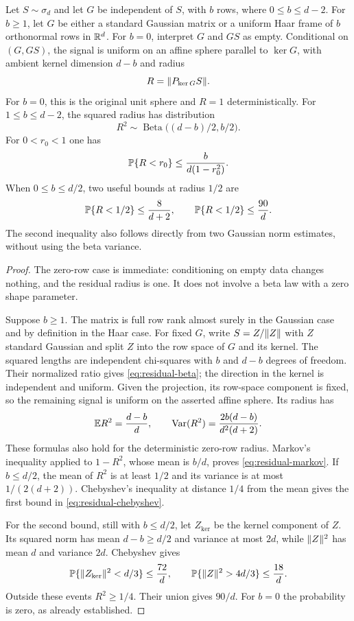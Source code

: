 \begin{lemma}\label{lem:residual-sphere}
Let $S\sim\sigma_d$ and let $G$ be independent of $S$, with $b$ rows,
where $0\le b\le d-2$. For $b\ge1$, let $G$ be either a standard Gaussian
matrix or a uniform Haar frame of $b$ orthonormal rows in $\mathbb R^d$. For $b=0$,
interpret $G$ and $GS$ as empty. Conditional on $(G,GS)$, the signal is uniform on an affine sphere
parallel to $\ker G$, with ambient kernel dimension $d-b$ and radius
\[
 R=\lVert P_{\ker G}S\rVert.
\]
For $b=0$, this is the original unit sphere and $R=1$ deterministically.
For $1\le b\le d-2$, the squared radius has distribution
\begin{equation}\label{eq:residual-beta}
 R^2\sim\operatorname{Beta}\bigl((d-b)/2,b/2\bigr).
\end{equation}
For $0<r_0<1$ one has
\begin{equation}\label{eq:residual-markov}
 \mathbb P\{R<r_0\}\le \frac{b}{d(1-r_0^2)}.
\end{equation}
When $0\le b\le d/2$, two useful bounds at radius $1/2$ are
\begin{equation}\label{eq:residual-chebyshev}
 \mathbb P\{R<1/2\}\le\frac{8}{d+2},
 \qquad
 \mathbb P\{R<1/2\}\le\frac{90}{d}.
\end{equation}
The second inequality also follows directly from two Gaussian norm
estimates, without using the beta variance.
\end{lemma}

\begin{proof}
The zero-row case is immediate: conditioning on empty data changes nothing,
and the residual radius is one. It does not involve a beta law with a zero
shape parameter.

Suppose $b\ge1$. The matrix is full row rank almost surely in the Gaussian
case and by definition in the Haar case. For fixed $G$,
write $S=Z/\lVert Z\rVert$ with $Z$ standard Gaussian and split $Z$ into the row
space of $G$ and its kernel. The squared lengths are independent
chi-squares with $b$ and $d-b$ degrees of freedom. Their normalized ratio
gives \eqref{eq:residual-beta}; the direction in the kernel is independent
and uniform. Given the projection, its row-space component is fixed, so
the remaining signal is uniform on the asserted affine sphere. Its radius
has
\[
 \mathbb E R^2=\frac{d-b}{d},\qquad
 \operatorname{Var}(R^2)=\frac{2b(d-b)}{d^2(d+2)}.
\]
These formulas also hold for the deterministic zero-row radius. Markov's
inequality applied to $1-R^2$, whose mean is $b/d$, proves
\eqref{eq:residual-markov}. If $b\le d/2$, the mean of $R^2$ is at least
$1/2$ and its variance is at most $1/(2(d+2))$. Chebyshev's inequality
at distance $1/4$ from the mean gives the first bound in
\eqref{eq:residual-chebyshev}.

For the second bound, still with $b\le d/2$, let $Z_{\ker}$ be the kernel
component of $Z$. Its squared norm has mean $d-b\ge d/2$ and variance at
most $2d$, while $\lVert Z\rVert^2$ has mean $d$ and variance $2d$. Chebyshev gives
\[
 \mathbb P\{\lVert Z_{\ker}\rVert^2<d/3\}\le\frac{72}{d},\qquad
 \mathbb P\{\lVert Z\rVert^2>4d/3\}\le\frac{18}{d}.
\]
Outside these events $R^2\ge1/4$. Their union gives $90/d$. For $b=0$
the probability is zero, as already established.
\end{proof}

